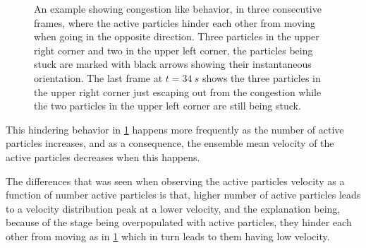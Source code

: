 \begin{figure}[H]
\centering
 \quad
{} \quad
{} \quad
\caption{An example showing congestion like behavior, in three consecutive frames,  where the active particles hinder each 
other from moving when going in the opposite direction. Three particles in the upper right corner and 
two in the upper left corner, the particles being stuck are marked with black arrows showing their instantaneous orientation. 
The last frame at $t=\SI{34}{s}$ shows the three particles in the upper right corner just escaping out from the congestion 
while the two particles in the upper left corner are still being stuck.}
\label{fig:0W300C25B_congestion}
\end{figure}



This hindering behavior in \cref{fig:0W300C25B_congestion} happens more frequently as the number of active particles increases, and 
as a consequence, the ensemble mean velocity of the active particles decreases when this happens. 

The differences that was seen when observing the active particles velocity as a function of number active particles is that, 
higher number of active particles leads to a velocity distribution peak at a lower velocity, 
and the explanation being, because of the stage being overpopulated with active particles, they hinder each other from moving 
as in \cref{fig:0W300C25B_congestion} which in turn leads to them having low velocity.



